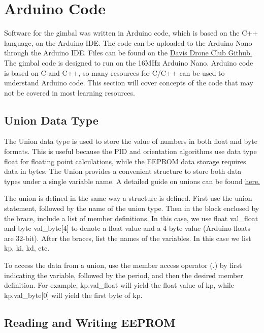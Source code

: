 \documentclass[11pt]{article} %
\begin{document}
\section{Arduino Code}

Software for the gimbal was written in Arduino code, which is based on the C++ language, on the Arduino IDE. The code can be uploaded to the Arduino Nano through the Arduino IDE. Files can be found on the \href{https://github.com/DavisDroneClub/gimbal}{Davis Drone Club Github.}
The gimbal code is designed to run on the 16MHz Arduino Nano. Arduino code is based on C and C++, so many resources for C/C++ can be used to understand Arduino code. This section will cover concepts of the code that may not be covered in most learning resources.

\subsection{Union Data Type}

The Union data type is used to store the value of numbers in both float and byte formats. This is useful because the PID and orientation algorithms use data type float for floating point calculations, while the EEPROM data storage requires data in bytes. The Union provides a convenient structure to store both data types under a single variable name. A detailed guide on unions can be found \href{https://www.tutorialspoint.com/cprogramming/c_unions.htm}{here.}



The union is defined in the same way a structure is defined. First use the union statement, followed by the name of the union type. Then in the block enclosed by the brace, include a list of member definitions. In this case, we use float val\_float and byte val\_byte[4] to denote a float value and a 4 byte value (Arduino floats are 32-bit). After the braces, list the names of the variables. In this case we list kp, ki, kd, etc. 

To access the data from a union, use the member access operator (.) by first indicating the variable, followed by the period, and then the desired member definition. For example, kp.val\_float will yield the float value of kp, while kp.val\_byte[0] will yield the first byte of kp. 


\subsection{Reading and Writing EEPROM}
\end{document}

